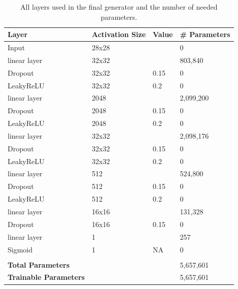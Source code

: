 \documentclass[12pt, fleqn, titlepage]{article}
\begin{document}
\begin{table}[H]
	\centering
	\begin{tabular}{llll}\toprule
		Layer                        & Activation Size & Value & \# Parameters \\ \midrule
		Input                        & 28x28           &       & 0             \\
		linear layer                 & 32x32           &       & 803,840       \\
		Dropout                      & 32x32           & 0.15  & 0             \\
		LeakyReLU                    & 32x32           & 0.2   & 0             \\
		linear layer                 & 2048            &       & 2,099,200     \\
		Dropout                      & 2048            & 0.15  & 0             \\
		LeakyReLU                    & 2048            & 0.2   & 0             \\
		linear layer                 & 32x32           &       & 2,098,176     \\
		Dropout                      & 32x32           & 0.15  & 0             \\
		LeakyReLU                    & 32x32           & 0.2   & 0             \\
		linear layer                 & 512             &       & 524,800       \\
		Dropout                      & 512             & 0.15  & 0             \\
		LeakyReLU                    & 512             & 0.2   & 0             \\
		linear layer                 & 16x16           &       & 131,328       \\
		Dropout                      & 16x16           & 0.15  & 0             \\
		linear layer                 & 1               &       & 257           \\
		Sigmoid                      & 1               & NA    & 0             \\
		                             &                 &       &               \\
		\textbf{Total Parameters}    &                 &       & 5,657,601     \\
		\textbf{Trainable Parameters}&                 &       & 5,657,601     \\ \bottomrule
	\end{tabular}
	\caption{All layers used in the final generator and the number of needed parameters.}
	\label{tab:gan_discriminator}
\end{table}
\end{document}
